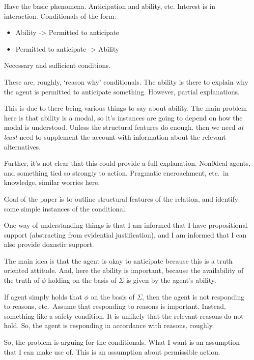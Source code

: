 \documentclass[10pt]{article}
\begin{document}
{
  \color{red}
  Have the basic phenomena.
  Anticipation and ability, etc.
  Interest is in interaction.
  Conditionals of the form:
  \begin{itemize}
  \item Ability -> Permitted to anticipate
  \item Permitted to anticipate -> Ability
  \end{itemize}
  Necessary and sufficient conditions.

  These are, roughly, `reason why' conditionals.
  The ability is there to explain why the agent is permitted to anticipate something.
  However, partial explanations.

  This is due to there being various things to say about ability.
  The main problem here is that ability is a modal, so it's instances are going to depend on how the modal is understood.
  Unless the structural features do enough, then we need \emph{at least} need to supplement the account with information about the relevant alternatives.
  
  Further, it's not clear that this could provide a full explanation.
  Non0deal agents, and something tied so strongly to action.
  Pragmatic encroachment, etc.\ in knowledge, similar worries here.

  {
    \color{red}
    Goal of the paper is to outline structural features of the relation, and identify some simple instances of the conditional.
    
  }

  {
    \color{blue}
    One way of understanding things is that I am informed that I have propositional support (abstracting from evidential justification), and I am informed that I can also provide doxastic support.

    The main idea is that the agent is okay to anticipate because this is a truth oriented attitude.
    And, here the ability is important, because the availability of the truth of \(\phi\) holding on the basis of \(\Sigma\) is given by the agent's ability.

    If agent simply holds that \(\phi\) on the basis of \(\Sigma\), then the agent is not responding to reasons, etc.\
    Assume that responding to reasons is important.
    Instead, something like a safety condition.
    It is unlikely that the relevant reasons do not hold.
    So, the agent is responding in accordance with reasons, roughly.
  }

  {
    \color{red}
    So, the problem is arguing for the conditionals.
    What I want is an assumption that I can make use of.
    This is an assumption about permissible action.

}}
\end{document}
